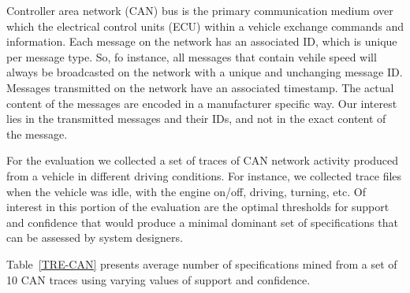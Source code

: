 \documentclass[]{sigplanconf}
\begin{document}
Controller area network (CAN) bus is the primary communication medium over which the electrical control units (ECU) within a vehicle exchange commands and information. Each message on the network has an associated ID, which is unique per message type. So, fo instance, all messages that contain vehile speed will always be broadcasted on the network with a unique and unchanging message ID. Messages transmitted on the network have an associated timestamp. The actual content of the messages are encoded in a manufacturer specific way. Our interest lies in the transmitted messages and their IDs, and not in the exact content of the message.


For the evaluation we collected a set of traces of CAN network activity produced from a vehicle in different driving conditions. For instance, we collected trace files when the vehicle was idle, with the engine on/off, driving, turning, etc. Of interest in this portion of the evaluation are the optimal thresholds for support and confidence that would produce a minimal dominant set of specifications that can be assessed by system designers.


Table~\ref{TRE-CAN} presents average number of specifications mined from a set of 10 CAN traces using varying values of support and confidence.
\end{document}
